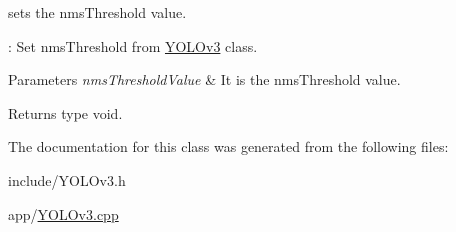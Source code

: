 sets the nms\+Threshold value. 

\+: Set nms\+Threshold from \hyperlink{classYOLOv3}{Y\+O\+L\+Ov3} class.


\begin{DoxyParams}{Parameters}
{\em nms\+Threshold\+Value} & It is the nms\+Threshold value. \\
\hline
\end{DoxyParams}
\begin{DoxyReturn}{Returns}
type void. 
\end{DoxyReturn}


The documentation for this class was generated from the following files\+:\begin{DoxyCompactItemize}
\item 
include/Y\+O\+L\+Ov3.\+h\item 
app/\hyperlink{YOLOv3_8cpp}{Y\+O\+L\+Ov3.\+cpp}\end{DoxyCompactItemize}
